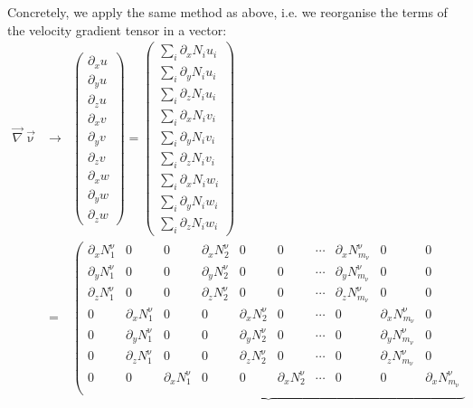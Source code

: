 Concretely, we apply the same method as above, i.e. we reorganise the terms of the 
velocity gradient tensor in a vector:
\begin{eqnarray}
\vec\nabla \vec\upnu 
&\rightarrow &
\left(
\begin{array}{c}
\partial_x u \\
\partial_y u \\
\partial_z u \\
\partial_x v \\
\partial_y v \\
\partial_z v \\
\partial_x w \\
\partial_y w \\
\partial_z w 
\end{array}
\right)
=
\left(
\begin{array}{c}
\sum_i \partial_x N_i u_i \\
\sum_i \partial_y N_i u_i \\
\sum_i \partial_z N_i u_i \\
\sum_i \partial_x N_i v_i \\
\sum_i \partial_y N_i v_i \\
\sum_i \partial_z N_i v_i \\
\sum_i \partial_x N_i w_i \\
\sum_i \partial_y N_i w_i \\
\sum_i \partial_z N_i w_i 
\end{array}
\right) \nonumber\\
&=&
\underbrace{
\left(
\begin{array}{cccccccccc}
\partial_x N_1^\upnu & 0 & 0 & \partial_x N_2^\upnu & 0 & 0 & \cdots & \partial_x N^\upnu_{m_\upnu} & 0 & 0 \\
\partial_y N_1^\upnu & 0 & 0 & \partial_y N_2^\upnu & 0 & 0 & \cdots & \partial_y N^\upnu_{m_\upnu} & 0 & 0 \\
\partial_z N_1^\upnu & 0 & 0 & \partial_z N_2^\upnu & 0 & 0 & \cdots & \partial_z N^\upnu_{m_\upnu} & 0 & 0 \\
0 & \partial_x N_1^\upnu & 0 & 0& \partial_x N_2^\upnu & 0 & \cdots & 0 & \partial_x N^\upnu_{m_\upnu}  & 0 \\
0 & \partial_y N_1^\upnu & 0 & 0& \partial_y N_2^\upnu & 0 & \cdots & 0 & \partial_y N^\upnu_{m_\upnu}  & 0 \\
0 & \partial_z N_1^\upnu & 0 & 0& \partial_z N_2^\upnu & 0 & \cdots & 0 & \partial_z N^\upnu_{m_\upnu}  & 0 \\
0 & 0 & \partial_x N_1^\upnu  & 0& 0& \partial_x N_2^\upnu & \cdots & 0 & 0 & \partial_x N^\upnu_{m_\upnu}  \\

\end{array}}
\end{eqnarray}
